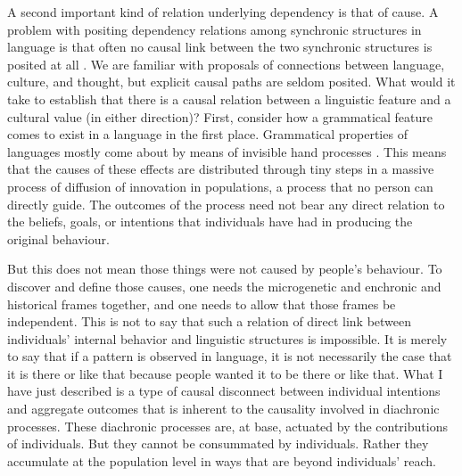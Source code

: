 \documentclass[output=paper]{langsci/langscibook}
\begin{document}
   A second important kind of relation underlying dependency is that of cause. A problem with positing dependency relations among synchronic structures in language is that often no causal link between the two synchronic structures is posited at all \citep[201]{Clark1984}. We are familiar with proposals of connections between language, culture, and thought, but explicit causal paths are seldom posited. What would it take to establish that there is a causal relation between a linguistic feature and a cultural value (in either direction)? First, consider how a grammatical feature comes to exist in a language in the first place. Grammatical properties of languages mostly come about by means of invisible hand processes \citep[Bk 4 Ch 2]{Smith1776}.  This means that the causes of these effects are distributed through tiny steps in a massive process of diffusion of innovation in populations, a process that no person can directly guide. The outcomes of the process need not bear any direct relation to the beliefs, goals, or intentions that individuals have had in producing the original behaviour. 

  But this does not mean those things were not caused by people’s behaviour. To discover and define those causes, one needs the microgenetic and enchronic and historical frames together, and one needs to allow that those frames be independent. This is not to say that such a relation of direct link between individuals' internal behavior and linguistic structures is impossible. It is merely to say that if a pattern is observed in language, it is not necessarily the case that it is there or like that because people wanted it to be there or like that. What I have just described is a type of causal disconnect between individual intentions and aggregate outcomes that is inherent to the causality involved in diachronic processes.  These diachronic processes are, at base, actuated by the contributions of individuals. But they cannot be consummated by individuals. Rather they accumulate at the population level in ways that are beyond individuals’ reach. 
\end{document}
